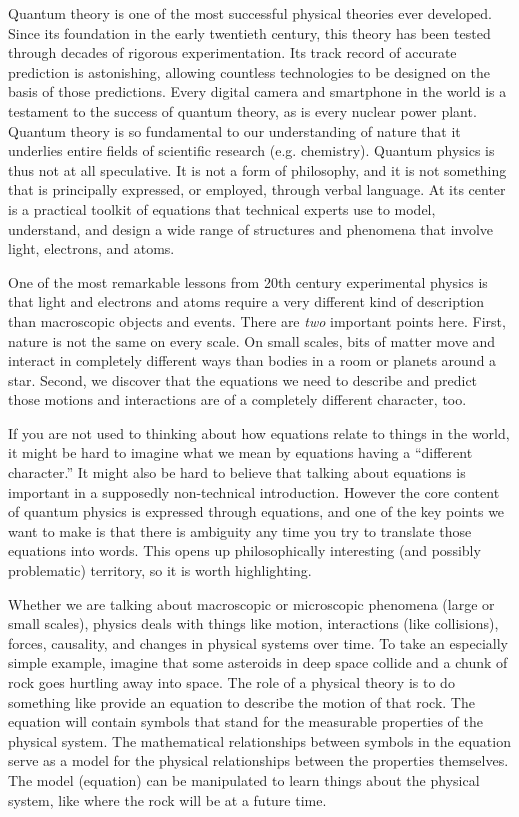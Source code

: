 \documentclass[12pt,onecolumn,preprintnumbers,amsmath,amssymbn,reprint,nofootinbib,superscriptaddress]{revtex4}    %
\begin{document}
Quantum theory is one of the most successful physical theories ever developed.  Since its foundation in the early twentieth century, this theory has been tested through decades of rigorous experimentation. Its track record of accurate prediction is astonishing, allowing countless technologies to be designed on the basis of those predictions.  Every digital camera and smartphone in the world is a testament to the success of quantum theory, as is every nuclear power plant.  Quantum theory is so fundamental to our understanding of nature that it underlies entire fields of scientific research (e.g. chemistry).  Quantum physics is thus not at all speculative.  It is not a form of philosophy, and it is not something that is principally expressed, or employed, through verbal language.  At its center is a practical toolkit of equations that technical experts use to model, understand, and design a wide range of structures and phenomena that involve light, electrons, and atoms.  

One of the most remarkable lessons from 20th century experimental physics is that light and electrons and atoms require a very different kind of description than macroscopic objects and events.  There are {\em two} important points here. First, nature is not the same on every scale. On small scales, bits of matter move and interact in completely different ways than bodies in a room or planets around a star.  Second, we discover that the equations we need to describe and predict those motions and interactions are of a completely different character, too.  

If you are not used to thinking about how equations relate to things in the world, it might be hard to imagine what we mean by equations having a ``different character.''  It might also be hard to believe that talking about equations is important in a supposedly non-technical introduction. However the core content of quantum physics is expressed through equations, and one of the key points we want to make is that there is ambiguity any time you try to translate those equations into words.  This opens up philosophically interesting (and possibly problematic) territory, so it is worth highlighting.      

Whether we are talking about macroscopic or microscopic phenomena (large or small scales), physics deals with things like motion, interactions (like collisions), forces, causality, and changes in physical systems over time. To take an especially simple example, imagine that some asteroids in deep space collide and a chunk of rock goes hurtling away into space.  The role of a physical theory is to do something like provide an equation to describe the motion of that rock.  The equation will contain symbols that stand for the measurable properties of the physical system.  The mathematical relationships between symbols in the equation serve as a model for the physical relationships between the properties themselves.  The model (equation) can be manipulated to learn things about the physical system, like where the rock will be at a future time. 
\end{document}
